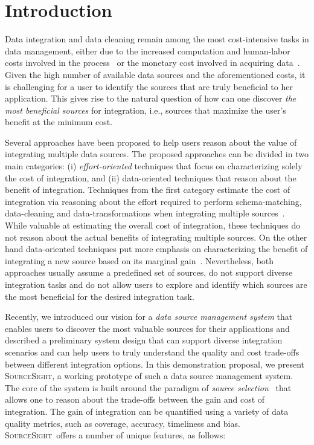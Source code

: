 \documentclass{vldb}
\newcommand\system{\textsc{SourceSight}}
\begin{document}
\section{Introduction}
Data integration and data cleaning remain among the most cost-intensive tasks in data management, either due to the increased computation and human-labor costs involved in the process~\cite{kruse2015estimating} or the monetary cost involved in acquiring data~\cite{balazinska:vldb11}. Given the high number of available data sources and the aforementioned costs, it is challenging for a user to identify the sources that are truly beneficial to her application. This gives rise to the natural question of how can one discover {\em the most beneficial sources} for integration, i.e., sources that maximize the user's benefit at the minimum cost. 

Several approaches have been proposed to help users reason about the value of integrating multiple data sources. The proposed approaches can be divided in two main categories: (i) {\em effort-oriented} techniques that focus on characterizing solely the cost of integration, and (ii) data-oriented techniques that reason about the benefit of integration. Techniques from the first category estimate the cost of integration via reasoning about the effort required to perform schema-matching, data-cleaning and data-transformations when integrating multiple sources~\cite{kruse2015estimating, smith:2009}. While valuable at estimating the overall cost of integration, these techniques do not reason about the actual benefits of integrating multiple sources. On the other hand data-oriented techniques put more emphasis on characterizing the benefit of integrating a new source based on its marginal gain~\cite{dong:vldb13,rekatsinas:2014}. Nevertheless, both approaches usually assume a predefined set of sources, do not support diverse integration tasks and do not allow users to explore and identify which sources are the most beneficial for the desired integration task. 

Recently, we introduced our vision for a {\em data source management system} that enables users to discover the most valuable sources for their applications and described a preliminary system design that can support diverse integration scenarios and can help users to truly understand the quality and cost trade-offs between different integration options. In this demonstration proposal, we present \system, a working prototype of such a data source management system. The core of the system is built around the paradigm of {\em source selection}~\cite{dong:vldb13} that allows one to reason about the trade-offs between the gain and cost of integration. The gain of integration can be quantified using a variety of data quality metrics, such as coverage, accuracy, timeliness and bias. \system~offers a number of unique features, as follows:
\end{document}

